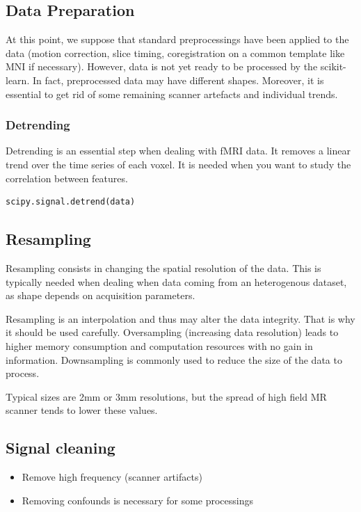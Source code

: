 \documentclass{frontiersSCNS} %
\begin{document}
\subsection{Data Preparation}

At this point, we suppose that standard preprocessings have been applied to the
data (motion correction, slice timing, coregistration on a common template like
MNI if necessary).
However, data is not yet ready to be processed by the scikit-learn. In
fact, preprocessed data may have different shapes. Moreover, it is essential to
get rid of some remaining scanner artefacts and individual trends.

\subsubsection{Detrending}

Detrending is an essential step when dealing with fMRI data. It removes a
linear trend over the time series of each
voxel. It is needed when you want to study the correlation between
features.

\begin{lstlisting}
scipy.signal.detrend(data)
\end{lstlisting}

\subsection{Resampling}

Resampling consists in changing the spatial resolution of the data. This is
typically needed
when dealing when data coming from an heterogenous dataset, as shape depends
on acquisition parameters.

Resampling is an interpolation and thus may alter the data integrity. That is
why it should be used carefully. Oversampling (increasing
data resolution) leads to higher memory consumption and computation resources
with no gain in information.
Downsampling is commonly used to reduce the size of the data to process.

Typical sizes are 2mm or 3mm resolutions, but the spread of high field MR
scanner tends to lower these values.

\subsection{Signal cleaning}

\begin{itemize}
    \item Remove high frequency (scanner artifacts)
    \item Removing confounds is necessary for some processings
\end{itemize}
\end{document}
